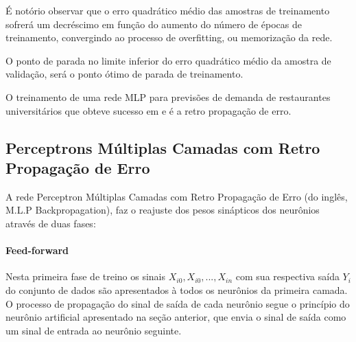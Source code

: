 \documentclass[	12pt, Times, openright, twoside, a4paper, english, brazil]{abntex2}
\begin{document}
            	É notório observar que o erro quadrático médio das amostras de treinamento sofrerá um decréscimo em função do aumento do número de épocas de treinamento, convergindo ao processo de overfitting, ou memorização da rede.
            	
            	O ponto de parada no limite inferior do erro quadrático médio da amostra de validação, será o ponto ótimo de parada de treinamento.
          	
          	\begin{figure}[H]
          	\end{figure}
        
        O treinamento de uma rede MLP para previsões de demanda de restaurantes universitários que obteve sucesso em \cite{Lopes2008} e \cite{Rocha2011} é a retro propagação de erro.
        \subsection{Perceptrons Múltiplas Camadas com Retro Propagação de Erro}
        A rede Perceptron Múltiplas Camadas com Retro Propagação de Erro (do inglês, M.L.P Backpropagation), faz o reajuste dos pesos sinápticos dos neurônios através de duas fases:
  	       \paragraph*{Feed-forward} Nesta primeira fase de treino os sinais $X_{i0},X_{i0},...,X_{in}$ com sua respectiva saída $Y_i$ do conjunto de dados são apresentados à todos os neurônios da primeira camada. O processo de propagação do sinal de saída de cada neurônio segue o princípio do neurônio artificial apresentado na seção anterior, que envia o sinal de saída como um sinal de entrada ao neurônio seguinte.
  	       
\end{document}
